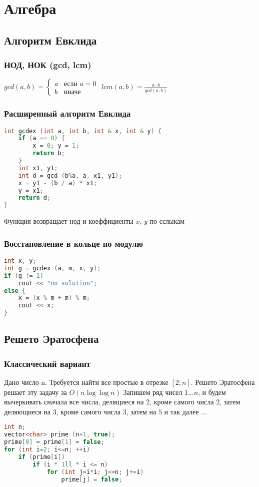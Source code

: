 \chapter{Алгебра}
\section{Алгоритм Евклида}
\subsection{НОД, НОК (gcd, lcm)}
$
	gcd(a, b) = 
		\begin{cases}
			a &\text{если } a = 0 \\
			b & \text{иначе}
		\end{cases}
$
\newline
$lcm(a, b) = \frac{a \cdot b}{gcd(a, b)}$

\subsection{Расширенный алгоритм Евклида}
\begin{lstlisting}[language=C++]
int gcdex (int a, int b, int & x, int & y) {
	if (a == 0) {
		x = 0; y = 1;
		return b;
	}
	int x1, y1;
	int d = gcd (b%a, a, x1, y1);
	x = y1 - (b / a) * x1;
	y = x1;
	return d;
}
\end{lstlisting}
Функция возвращает нод и коеффициенты $x$, $y$ по сслыкам

\subsection{Восстановление в кольце по модулю}
\begin{lstlisting}[language=C++]
int x, y;
int g = gcdex (a, m, x, y);
if (g != 1)
	cout << "no solution";
else {
	x = (x % m + m) % m;
	cout << x;
}
\end{lstlisting}

\section{Решето Эратосфена}
\subsection{Классический вариант}
Дано число n. Требуется найти все простые в отрезке $[2; n]$.
Решето Эратосфена решает эту задачу за $O (n \log \log n)$ \newline
Запишем ряд чисел $1 \ldots n$, и будем вычеркивать сначала все числа, делящиеся на $2$, кроме самого числа $2$, затем деляющиеся на $3$, кроме самого числа $3$, затем на $5$ и так далее $\ldots$
\begin{lstlisting}[language=C++]
int n;
vector<char> prime (n+1, true);
prime[0] = prime[1] = false;
for (int i=2; i<=n; ++i)
	if (prime[i])
		if (i * 1ll * i <= n)
			for (int j=i*i; j<=n; j+=i)
				prime[j] = false;
\end{lstlisting}

